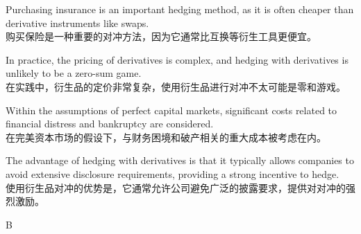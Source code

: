 \documentclass{article}
\begin{document}
\begin{choices}
    \item Purchasing insurance is an important hedging method, as it is often cheaper than derivative instruments like swaps. \\
    购买保险是一种重要的对冲方法，因为它通常比互换等衍生工具更便宜。

    \item In practice, the pricing of derivatives is complex, and hedging with derivatives is unlikely to be a zero-sum game. \\
    在实践中，衍生品的定价非常复杂，使用衍生品进行对冲不太可能是零和游戏。

    \item Within the assumptions of perfect capital markets, significant costs related to financial distress and bankruptcy are considered. \\
    在完美资本市场的假设下，与财务困境和破产相关的重大成本被考虑在内。

    \item The advantage of hedging with derivatives is that it typically allows companies to avoid extensive disclosure requirements, providing a strong incentive to hedge. \\
    使用衍生品对冲的优势是，它通常允许公司避免广泛的披露要求，提供对对冲的强烈激励。
\end{choices}



\begin{correctanswer}
    B
\end{correctanswer}
\end{document}
